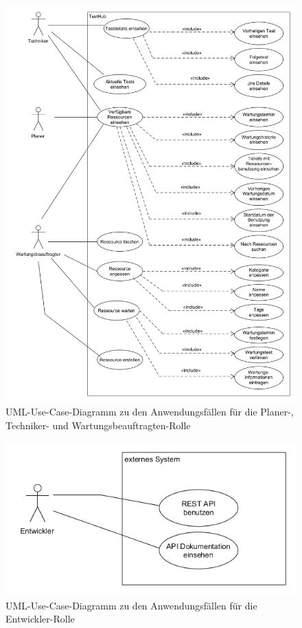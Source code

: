 \begin{figure}[H]
    \includegraphics[width=\linewidth]{diagramme/Usecases.png}
    \caption{UML-Use-Case-Diagramm zu den Anwendungsfällen für die Planer-, Techniker- und Wartungsbeauftragten-Rolle}\label{fig:usecases}
\end{figure}

\begin{figure}[H]
    \includegraphics[width=\linewidth]{diagramme/UsecasesEntwickler.png}
    \caption{UML-Use-Case-Diagramm zu den Anwendungsfällen für die Entwickler-Rolle}\label{fig:usecasesEntwickler}
\end{figure}

